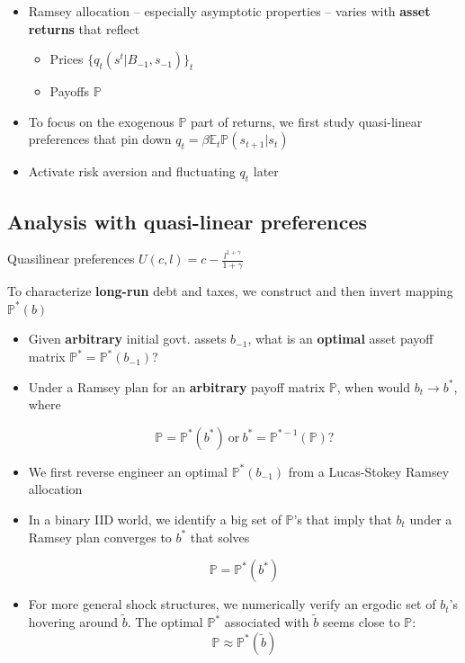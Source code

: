 \documentclass[12pt]{article}
\begin{document}
	\begin{itemize}
	\item Ramsey allocation -- especially asymptotic properties --   varies with   \textbf{asset returns} that reflect
	\begin{itemize}
	 \item Prices $\{q_t(s^t|B_{-1},s_{-1})\}_t$
	 \item Payoffs $\mathbb{P}$
	\end{itemize}
	
\item To focus on the exogenous $\mathbb{P}$ part of returns, we first study quasi-linear  preferences  that pin down $q_t=\beta \mathbb{E}_t
\mathbb{P}(s_{t+1}|s_t)$

\item Activate  risk aversion and fluctuating $q_t$ later
	
\end{itemize}

\subsection{Analysis with quasi-linear preferences}


Quasilinear preferences $U(c,l)=c-\frac{l^{1+\gamma}}{1+\gamma}$

 To characterize \textbf{long-run}  debt and  taxes,  we construct and then invert  mapping $\mathbb{P}^*(b)$

\begin{itemize}
 \item Given \textbf{arbitrary} initial govt. assets $b_{-1}$, what is  an \textbf{optimal} asset payoff matrix $\mathbb{P}^* =\mathbb{P}^*(b_{-1})$?

 \item Under a Ramsey plan for an \textbf{arbitrary} payoff matrix $\mathbb{P}$,  when would  $b_t \to b^*$, where

	\[\mathbb{P}=\mathbb{P}^*(b^*) \ \textrm{or} \ b^* = \mathbb{P}^{* -1}(\mathbb{P}) ?\]
	
\end{itemize}


	\begin{itemize}
	\item We first reverse engineer an optimal $\mathbb{P}^*(b_{-1})$ from a Lucas-Stokey  Ramsey allocation
	
	 \item In a binary IID world, we identify a big set of  $\mathbb{P}$'s that imply that $b_t$  under a Ramsey plan converges to $b^*$ that solves
	
	\[\mathbb{P}=\mathbb{P}^*(b^*)\]
	
	
	\item For more general shock structures, we numerically verify  an ergodic set of $b_t$'s
 hovering around $\tilde b$.    The optimal $\mathbb{P}^*$ associated with $\tilde b$ seems close to $\mathbb{P}$:
	\[\mathbb{P}\approx \mathbb{P}^*(\tilde b)\]
	\end{itemize}
\end{document}
